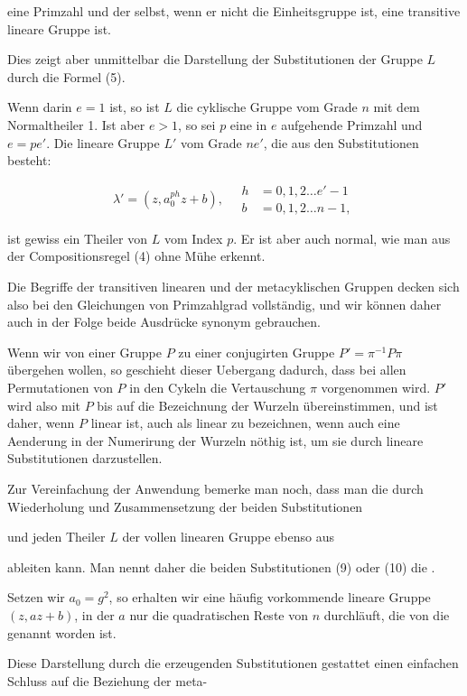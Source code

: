 eine Primzahl und der selbst, wenn er nicht die Einheitsgruppe
ist, eine transitive lineare Gruppe ist.

Dies zeigt aber unmittelbar die Darstellung der Substitutionen der Gruppe $L$ durch die Formel (5).

Wenn darin $e=1$ ist, so ist $L$ die cyklische Gruppe vom Grade $n$ mit dem Normaltheiler 1. Ist aber $e>1$, so sei $p$ eine in $e$ aufgehende Primzahl und $e=pe'$. Die lineare Gruppe $L'$ vom Grade $ne'$, die aus den Substitutionen besteht:

\[
\lambda' = (z, a_0^{ph} z + b), \quad
\begin{aligned}
h &= 0, 1, 2 \ldots e'-1\\
b &= 0, 1, 2 \ldots n-1,
\end{aligned}
\]

ist gewiss ein Theiler von $L$ vom Index $p$. Er ist aber auch normal, wie man aus der Compositionsregel (4) ohne Mühe erkennt.

Die Begriffe der transitiven linearen und der metacyklischen Gruppen decken sich also bei den Gleichungen von Primzahlgrad vollständig, und wir können daher auch in der Folge beide Ausdrücke synonym gebrauchen.

Wenn wir von einer Gruppe $P$ zu einer conjugirten Gruppe $P' = \pi^{-1}P\pi$ übergehen wollen, so geschieht dieser Uebergang dadurch, dass bei allen Permutationen von $P$ in den Cykeln die Vertauschung $\pi$ vorgenommen wird. $P'$ wird also mit $P$ bis auf die Bezeichnung der Wurzeln übereinstimmen, und ist daher, wenn $P$ linear ist, auch als linear zu bezeichnen, wenn auch eine Aenderung in der Numerirung der Wurzeln nöthig ist, um sie durch lineare Substitutionen darzustellen.

Zur Vereinfachung der Anwendung bemerke man noch, dass man die  durch Wiederholung und Zusammensetzung der beiden Substitutionen


und jeden Theiler $L$ der vollen linearen Gruppe ebenso aus


ableiten kann. Man nennt daher die beiden Substitutionen (9) oder (10) die .

Setzen wir $a_0 = g^2$, so erhalten wir eine häufig vorkommende lineare Gruppe $(z, az+b)$, in der $a$ nur die quadratischen Reste von $n$ durchläuft, die von  die  genannt worden ist.

Diese Darstellung durch die erzeugenden Substitutionen gestattet einen einfachen Schluss auf die Beziehung der meta-
